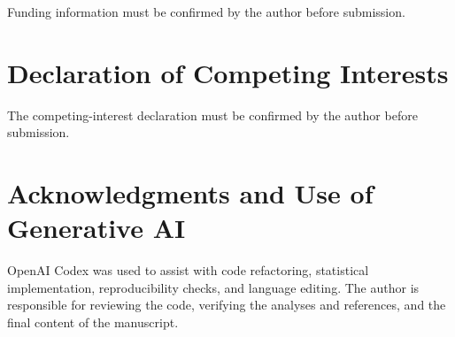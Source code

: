\documentclass[11pt]{article}
\begin{document}
Funding information must be confirmed by the author before submission.

\section*{Declaration of Competing Interests}

The competing-interest declaration must be confirmed by the author before
submission.

\section*{Acknowledgments and Use of Generative AI}

OpenAI Codex was used to assist with code refactoring, statistical
implementation, reproducibility checks, and language editing. The author is
responsible for reviewing the code, verifying the analyses and references, and
the final content of the manuscript.



\end{document}
